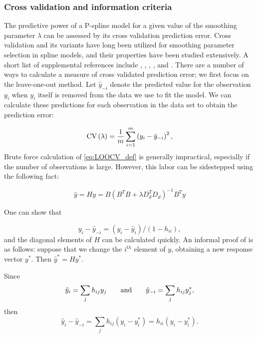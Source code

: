 \documentclass[12pt]{article}
\theoremstyle{definition}
\begin{document}
\subsubsection{Cross validation and information criteria}

The predictive power of a P-spline model for a given value of the smoothing parameter $\lambda$ can be assessed by its cross validation prediction error. Cross validation and its variants have long been utilized for smoothing parameter selection in spline models, and their properties have been studied extensively. A short list of supplemental references include \cite{craven1978smoothing}, \cite{wahba1985comparison}, \cite{hardle1988far}, \cite{hardle1992applied}, and \cite{wahba1990spline}. There are a number of ways to calculate a measure of cross validated prediction error; we first focus on the leave-one-out method. Let $\hat{y}_{-i}$ denote the predicted value for the observation $y_i$ when $y_i$ itself is removed from the data we use to fit the model. We can calculate these predictions for each observation in the data set to obtain the prediction error:

\begin{equation} \label{eq:LOOCV_def}
\textup{CV}\left(\lambda\right) = \frac{1}{m}\sum_{i=1}^m \left(  y_i - \hat{y}_{-i}\right)^2, 
\end{equation}
Brute force calculation of \ref{eq:LOOCV_def} is generally impractical, especially if the number of observations is large. However, this labor can be sidestepped using the following fact: 

\begin{equation*}
\hat{y} = Hy = B\left(B^TB + \lambda D_d^T D_d \right)^{-1} B^T y
\end{equation*}

One can show that 

\begin{equation} \label{eq:LOO_residual}
y_i - \hat{y}_{-i} = \left(y_i - \hat{y}_{i}\right)/\left(1-h_{ii}\right),
\end{equation}
\noindent
and the diagonal elements of $H$ can be calculated quickly. An informal proof of \label{eq:LOO_residual} is as follows: suppose that we change the $i^{th}$ element of $y$, obtaining a new response vector $y^*$. Then $\hat{y}^* = H y^*$.

 Since 
 \[
 \hat{y}_i = \sum_{j} h_{ij} y_j \qquad \textup{and} \qquad \hat{y}_{-i} = \sum_{j} h_{ij} y_j^*,
 \]
 \noindent
 then
 \[
 \hat{y}_i - \hat{y}_{-i} = \sum_j h_{ij} \left(y_i - y_i^*\right) = h_{ii} \left(y_i - y_i^*\right).  
\]
\end{document}
